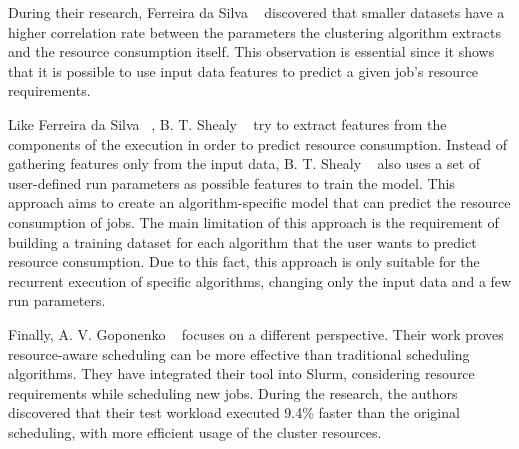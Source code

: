 During their research, Ferreira da Silva \etal~\cite{ferreira2013} discovered that smaller datasets have a higher correlation rate between the parameters the clustering algorithm extracts and the resource consumption itself.
This observation is essential since it shows that it is possible to use input data features to predict a given job's resource requirements.

Like Ferreira da Silva \etal~\cite{ferreira2013}, B. T. Shealy \etal~\cite{shealy2021} try to extract features from the components of the execution in order to predict resource consumption.
Instead of gathering features only from the input data, B. T. Shealy \etal~\cite{shealy2021} also uses a set of user-defined run parameters as possible features to train the model.
This approach aims to create an algorithm-specific model that can predict the resource consumption of jobs.
The main limitation of this approach is the requirement of building a training dataset for each algorithm that the user wants to predict resource consumption.
Due to this fact, this approach is only suitable for the recurrent execution of specific algorithms, changing only the input data and a few run parameters.

Finally, A. V. Goponenko \etal~\cite{goponenko2020} focuses on a different perspective.
Their work proves resource-aware scheduling can be more effective than traditional scheduling algorithms.
They have integrated their tool into Slurm, considering resource requirements while scheduling new jobs.
During the research, the authors discovered that their test workload executed 9.4\% faster than the original scheduling, with more efficient usage of the cluster resources.

